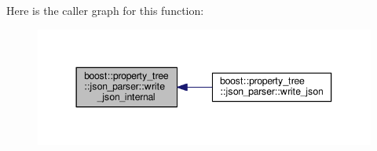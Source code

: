 Here is the caller graph for this function\-:
\nopagebreak
\begin{figure}[H]
\begin{center}
\leavevmode
\includegraphics[width=344pt]{namespaceboost_1_1property__tree_1_1json__parser_af1059520397d396ae91e776391a2f32b_icgraph}
\end{center}
\end{figure}


